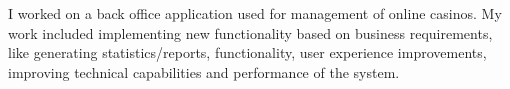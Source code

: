I worked on a back office application used for management of online casinos. 
My work included implementing new functionality based on business requirements, like generating statistics/reports, 
functionality, user experience improvements, improving technical capabilities and performance of the system.
